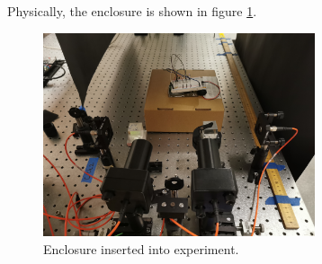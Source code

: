 \documentclass[letterpaper, 11 pt]{article}
\begin{document}
Physically, the enclosure is shown in figure \ref{fig:phys_enclose}.
\begin{figure}[H]
    \centering
    \includegraphics[width = 8cm]{enclose_phys.jpg}
    \caption{Enclosure inserted into experiment.}
    \label{fig:phys_enclose}
\end{figure}
\end{document}
